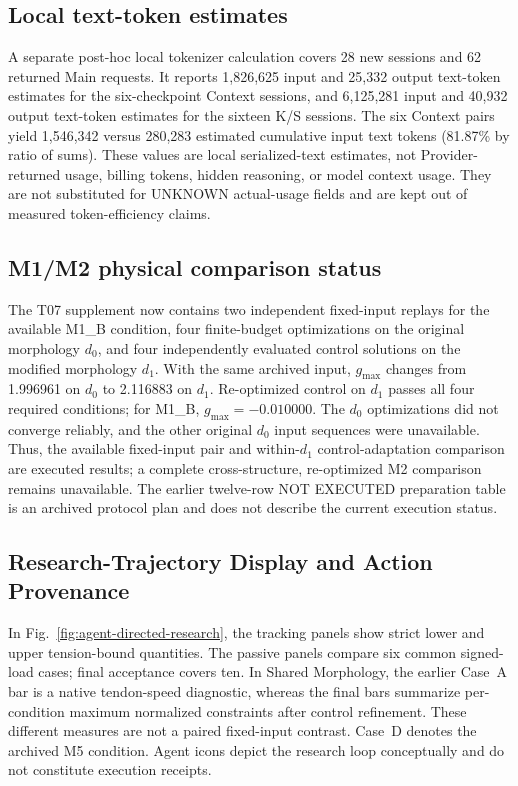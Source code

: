 \subsection{Local text-token estimates}

A separate post-hoc local tokenizer calculation covers 28 new sessions and 62 returned Main requests. It reports 1,826,625 input and 25,332 output text-token estimates for the six-checkpoint Context sessions, and 6,125,281 input and 40,932 output text-token estimates for the sixteen K/S sessions. The six Context pairs yield 1,546,342 versus 280,283 estimated cumulative input text tokens (81.87\% by ratio of sums). These values are local serialized-text estimates, not Provider-returned usage, billing tokens, hidden reasoning, or model context usage. They are not substituted for UNKNOWN actual-usage fields and are kept out of measured token-efficiency claims.

\subsection{M1/M2 physical comparison status}

The T07 supplement now contains two independent fixed-input replays for the available M1\_B condition, four finite-budget optimizations on the original morphology $d_0$, and four independently evaluated control solutions on the modified morphology $d_1$. With the same archived input, $g_{\max}$ changes from 1.996961 on $d_0$ to 2.116883 on $d_1$. Re-optimized control on $d_1$ passes all four required conditions; for M1\_B, $g_{\max}=-0.010000$. The $d_0$ optimizations did not converge reliably, and the other original $d_0$ input sequences were unavailable. Thus, the available fixed-input pair and within-$d_1$ control-adaptation comparison are executed results; a complete cross-structure, re-optimized M2 comparison remains unavailable. The earlier twelve-row NOT EXECUTED preparation table is an archived protocol plan and does not describe the current execution status.

\subsection{Research-Trajectory Display and Action Provenance}
In Fig.~\ref{fig:agent-directed-research}, the tracking panels show strict lower and upper tension-bound quantities. The passive panels compare six common signed-load cases; final acceptance covers ten. In Shared Morphology, the earlier Case~A bar is a native tendon-speed diagnostic, whereas the final bars summarize per-condition maximum normalized constraints after control refinement. These different measures are not a paired fixed-input contrast. Case~D denotes the archived M5 condition. Agent icons depict the research loop conceptually and do not constitute execution receipts.

